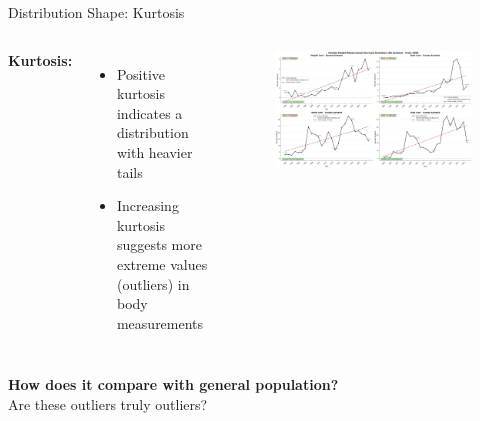 \documentclass[aspectratio=169,xcolor=dvipsnames,10pt]{beamer}
\begin{document}
\begin{frame}{Distribution Shape: Kurtosis}

    \begin{columns}
            \textbf{Kurtosis:} 
                \begin{itemize}
                    \setlength{\itemsep}{0.6em}
                    \item Positive kurtosis indicates a distribution with heavier tails
                    \item Increasing kurtosis suggests more extreme values (outliers) in body measurements
                \end{itemize}
                \begin{figure}
                    \includegraphics[width=\textwidth]{figures/kurtosis_evolution_female_eu_from_2000.png}
                \end{figure}
            
        
        \end{columns}
\end{frame}


\begin{frame}
    \Large{
        \begin{center}
            \textbf{How does it compare with general population?} \\
            \vspace{1em}
            Are these outliers truly outliers?\\
        \end{center}
    }
\end{frame}
\end{document}
